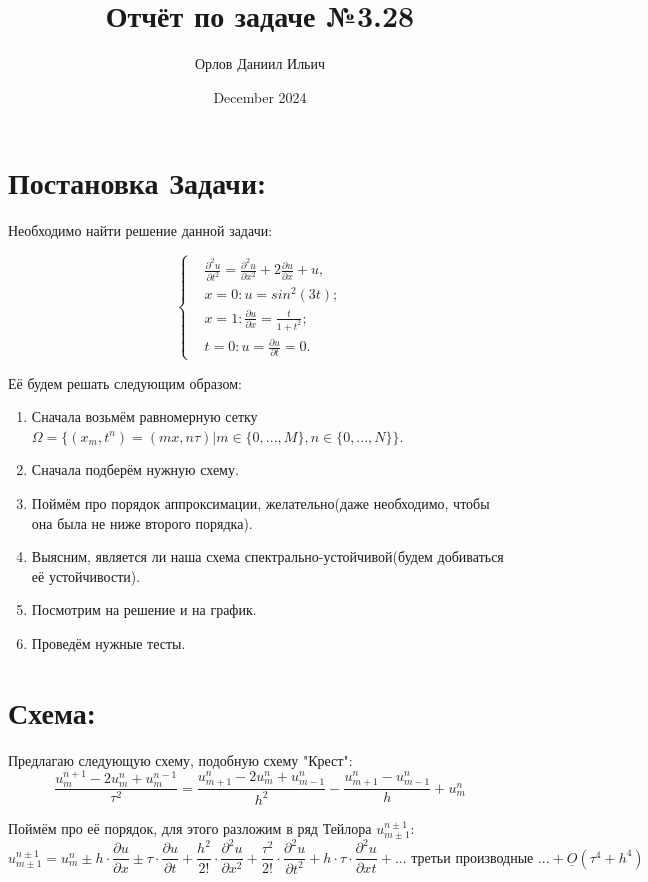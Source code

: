 \documentclass{article}
\title{Отчёт по задаче №3.28}
\author{Орлов Даниил Ильич}
\date{December 2024}
\begin{document}
	
	\maketitle
	
\section{Постановка Задачи:}
Необходимо найти решение данной задачи:

\begin{equation*}
	\left\{ \begin{aligned} 
		&\frac{\partial^2u}{\partial t^2} = \frac{\partial^2u}{\partial x^2} + 2\frac{\partial u}{\partial x} + u,\\
		&x = 0: u = sin^2(3t);\\
		&x = 1: \frac{\partial u}{\partial x} = \frac{t}{1 + t^2};\\
		&t = 0: u = \frac{\partial u}{\partial t} = 0.
	\end{aligned} \right.
\end{equation*}
	
Её будем решать следующим образом: 
	\begin{enumerate}
		\item Сначала возьмём равномерную сетку $\Omega = \{(x_m, t^n) = (mx, n\tau) | m\in\{0, ..., M\}, n\in\{0, ..., N\}\}.$
		\item Сначала подберём нужную схему.
		\item Поймём про порядок аппроксимации, желательно(даже необходимо, чтобы она была не ниже второго порядка).
		\item Выясним, является ли наша схема спектрально-устойчивой(будем добиваться её устойчивости).
		\item Посмотрим на решение и на график.
		\item Проведём нужные тесты.
	\end{enumerate}
	
\section{Схема:}
Предлагаю следующую схему, подобную схему "Крест":
\[
	\frac{u^{n + 1}_m - 2u^n_m + u^{n - 1}_m}{\tau^2} = \frac{u^n_{m + 1} - 2u^n_m + u^n_{m - 1}}{h^2} - \frac{u^n_{m + 1} - u^n_{m - 1}}{h} + u^n_m
\]

Поймём про её порядок, для этого разложим в ряд Тейлора $u^{n\pm 1}_{m\pm 1}$:
\[
	u^{n\pm 1}_{m\pm 1} = u^n_m \pm h\cdot\frac{\partial u}{\partial x} 
	\pm\tau\cdot\frac{\partial u}{\partial t} + \frac{h^2}{2!}\cdot\frac{\partial^2 u}{\partial x^2} + \frac{\tau^2}{2!}\cdot\frac{\partial^2 u}{\partial t^2} + h\cdot\tau\cdot\frac{\partial^2 u}{\partial xt} +  ...\text{ третьи производные }... + \underline O(\tau^4 + h^4)
\]
\end{document}
